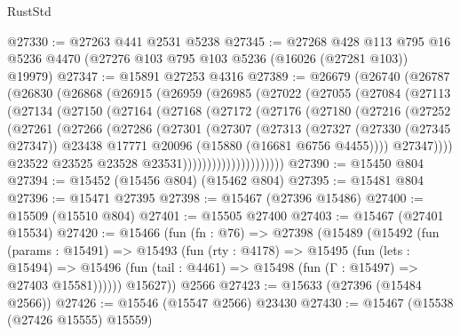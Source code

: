 \begin{lexlean}{RustStd}
\begin{coremodule}
@27330 := @27263 @441 @2531 @5238
@27345 := @27268
    @428
    @113
    @795
    @16
    @5236
    @4470
    (@27276 @103 @795 @103 @5236 (@16026 (@27281 @103)) @19979)
@27347 := @15891 @27253 @4316
@27389 := @26679
    (@26740
      (@26787
        (@26830
          (@26868
            (@26915
              (@26959
                (@26985
                  (@27022
                    (@27055
                      (@27084
                        (@27113
                          (@27134
                            (@27150
                              (@27164
                                (@27168
                                  (@27172
                                    (@27176
                                      (@27180
                                        (@27216
                                          (@27252
                                            (@27261
                                              (@27266
                                                (@27286
                                                  (@27301
                                                    (@27307
                                                      (@27313
                                                        (@27327
                                                          (@27330 (@27345 @27347))
                                                          @23438
                                                          @17771
                                                          @20096
                                                          (@15880 (@16681 @6756 @4455))))
                                                      @27347))))
                                              @23522
                                              @23525
                                              @23528
                                              @23531)))))))))))))))))))))
@27390 := @15450 @804
@27394 := @15452 (@15456 @804) (@15462 @804)
@27395 := @15481 @804
@27396 := @15471 @27395
@27398 := @15467 (@27396 @15486)
@27400 := @15509 (@15510 @804)
@27401 := @15505 @27400
@27403 := @15467 (@27401 @15534)
@27420 := @15466
    (fun (fn : @76) =>
    @27398
      (@15489
        (@15492
          (fun (params : @15491) =>
          @15493
            (fun (rty : @4178) =>
            @15495
              (fun (lets : @15494) =>
              @15496 (fun (tail : @4461) => @15498 (fun (Γ : @15497) => @27403 @15581))))))
        @15627))
    @2566
@27423 := @15633 (@27396 (@15484 @2566))
@27426 := @15546 (@15547 @2566) @23430
@27430 := @15467 (@15538 (@27426 @15555) @15559)

\end{coremodule}
\end{lexlean}
